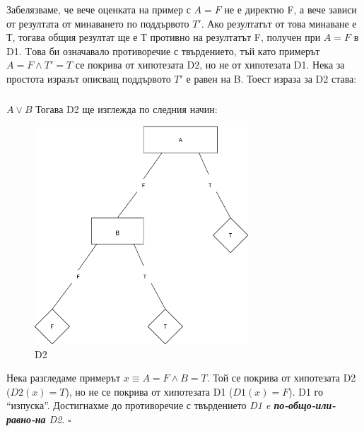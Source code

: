 \documentclass[12pt]{article}
\begin{document}
	Забелязваме, че вече оценката на пример с $A = F$ не е директно F, а вече зависи от резултата от минаването по поддървото $T'$. Ако резултатът от това минаване е Т, тогава общия резултат ще е Т противно на резултатът F, получен при $A = F$ в D1. Tова би означавало противоречие с твърдението, тъй като примерът $A = F \land T' = T$ се покрива от хипотезата D2, но не от хипотезата D1. Нека за простота изразът описващ поддървото $T'$ е равен на B. Тоест израза за D2 става:
	\subparagraph{}
	$A \lor B$
	\newline\newline
	Тогава D2 ще изглежда по следния начин:
	\begin{figure}[H]
		\centering
		\includegraphics[width=80mm]{Untitled Diagram10.png} 
		\caption{D2}
	\end{figure}
	
	Нека разгледаме примерът $x \equiv A = F \land B = T$. Той се покрива от хипотезата D2 ($D2(x) = T$), но не се покрива от хипотезата D1 ($D1(x) = F$). D1 го ``изпуска''. Достигнахме до противоречие с твърдението \textit{D1 e \textbf{по-общо-или-равно-на} D2}. $\square$
	
\end{document}
